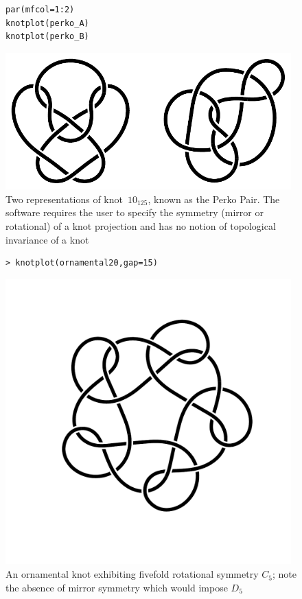 \documentclass{birkjour}
\theoremstyle{definition}
\theoremstyle{remark}
\numberwithin{equation}{section}
\begin{document}
\begin{figure}[htbp]
  \begin{center}
\begin{verbatim}
par(mfcol=1:2)
knotplot(perko_A)
knotplot(perko_B)
\end{verbatim}
\includegraphics[width=11cm]{knot-perko_A_and_B}
\caption{Two representations of knot~$10_{125}$, known as the 
  \label{perko_AB}  Perko Pair.  The software requires the user to
  specify the symmetry (mirror or rotational) of a knot projection and
  has no notion of topological invariance of a knot}
  \end{center}
\end{figure}

\begin{figure}[htbp]
  \begin{center}
\begin{verbatim}
> knotplot(ornamental20,gap=15)
\end{verbatim}
\includegraphics[width=11cm]{knot-ornamental}
\caption{An ornamental knot exhibiting fivefold
  rotational \label{orn20} symmetry $C_5$; note the absence of mirror
  symmetry which would impose $D_5$}
  \end{center}
\end{figure}
\end{document}
